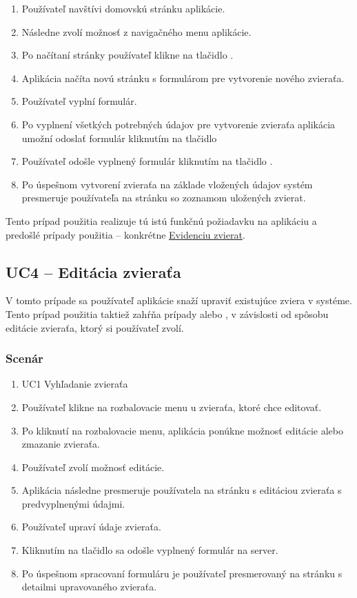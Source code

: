 \begin{enumerate}
	\item Používateľ navštívi domovskú stránku aplikácie.
	\item Následne zvolí možnosť  z navigačného menu aplikácie.
	\item Po načítaní stránky používateľ klikne na tlačidlo .
	\item Aplikácia načíta novú stránku s formulárom pre vytvorenie nového zvieraťa.
	\item Používateľ vyplní formulár.
	\item Po vyplnení všetkých potrebných údajov pre vytvorenie zvieraťa aplikácia umožní odoslať formulár kliknutím na tlačidlo 
	\item Používateľ odošle vyplnený formulár kliknutím na tlačidlo .
	\item Po úspešnom vytvorení zvieraťa na základe vložených údajov systém presmeruje používateľa na stránku so zoznamom uložených zvierat.
\end{enumerate}

Tento prípad použitia realizuje tú istú funkčnú požiadavku na aplikáciu a predošlé prípady použitia -- konkrétne \hyperref[evidencia-zvierat]{Evidenciu zvierat}.

\subsection*{UC4 -- Editácia zvieraťa}

V tomto prípade sa používateľ aplikácie snaží upraviť existujúce zviera v systéme. Tento prípad použitia taktiež zahŕňa prípady 
 alebo , v závislosti od spôsobu editácie zvieraťa, ktorý si používateľ zvolí.

\subsubsection*{Scenár}

\begin{enumerate}
	\item UC1 Vyhľadanie zvieraťa
	\item Používateľ klikne na rozbalovacie menu u zvieraťa, ktoré chce editovať.
	\item Po kliknutí na rozbalovacie menu, aplikácia ponúkne možnosť editácie alebo zmazanie zvieraťa.
	\item Používateľ zvolí možnosť editácie.
	\item Aplikácia následne presmeruje používatela na stránku s editáciou zvieraťa s predvyplnenými údajmi.
	\item Používateľ upraví údaje zvieraťa.
	\item Kliknutím na tlačidlo  sa odošle vyplnený formulár na server.
	\item Po úspešnom spracovaní formuláru je používateľ presmerovaný na stránku s detailmi upravovaného zvieraťa.
\end{enumerate}

